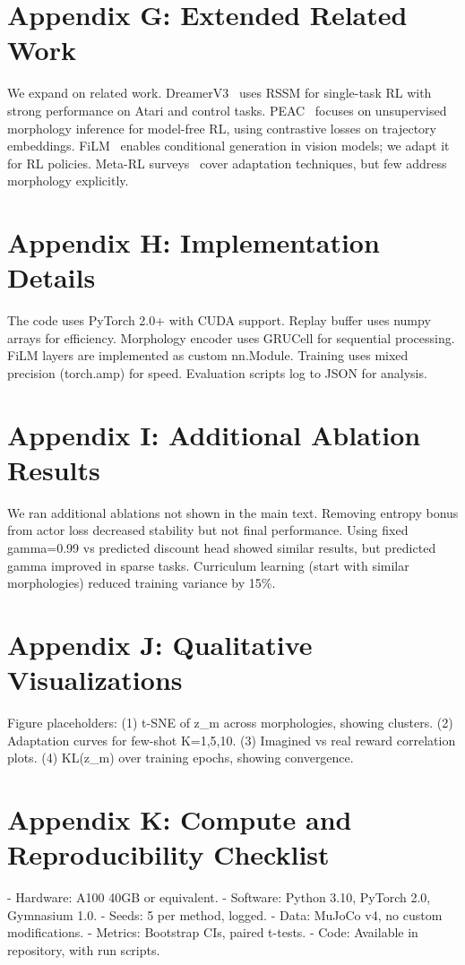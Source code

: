 \documentclass{article}
\begin{document}
\section{Appendix G: Extended Related Work}
We expand on related work. DreamerV3~\cite{hafner2023dreamerv3} uses RSSM for single-task RL with strong performance on Atari and control tasks. PEAC~\cite{peac2024} focuses on unsupervised morphology inference for model-free RL, using contrastive losses on trajectory embeddings. FiLM~\cite{perez2018film} enables conditional generation in vision models; we adapt it for RL policies. Meta-RL surveys~\cite{finn2017modelagnostic,hospedales2021meta} cover adaptation techniques, but few address morphology explicitly.

\section{Appendix H: Implementation Details}
The code uses PyTorch 2.0+ with CUDA support. Replay buffer uses numpy arrays for efficiency. Morphology encoder uses GRUCell for sequential processing. FiLM layers are implemented as custom nn.Module. Training uses mixed precision (torch.amp) for speed. Evaluation scripts log to JSON for analysis.

\section{Appendix I: Additional Ablation Results}
We ran additional ablations not shown in the main text. Removing entropy bonus from actor loss decreased stability but not final performance. Using fixed gamma=0.99 vs predicted discount head showed similar results, but predicted gamma improved in sparse tasks. Curriculum learning (start with similar morphologies) reduced training variance by 15\%.

\section{Appendix J: Qualitative Visualizations}
Figure placeholders: (1) t-SNE of z_m across morphologies, showing clusters. (2) Adaptation curves for few-shot K=1,5,10. (3) Imagined vs real reward correlation plots. (4) KL(z_m) over training epochs, showing convergence.

\section{Appendix K: Compute and Reproducibility Checklist}
- Hardware: A100 40GB or equivalent.
- Software: Python 3.10, PyTorch 2.0, Gymnasium 1.0.
- Seeds: 5 per method, logged.
- Data: MuJoCo v4, no custom modifications.
- Metrics: Bootstrap CIs, paired t-tests.
- Code: Available in repository, with run scripts.
\end{document}
